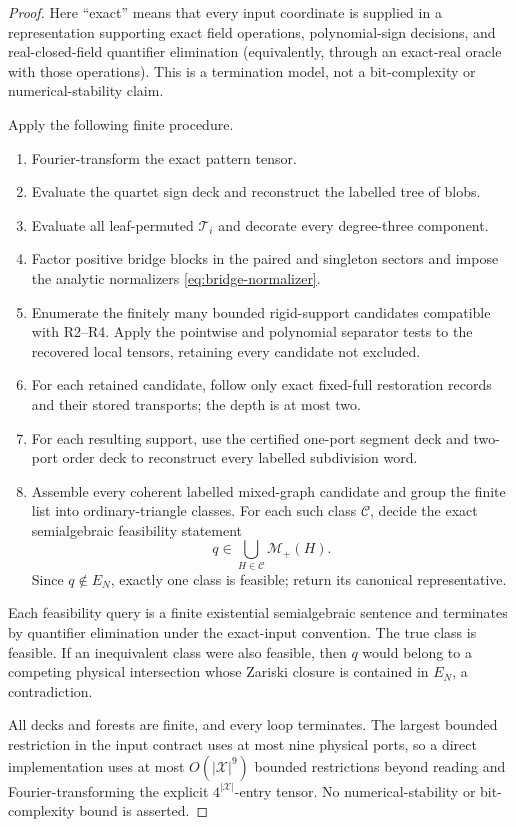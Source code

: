 \documentclass[11pt]{article}
\theoremstyle{remark}
\newcommand{\X}{\mathcal X}
\newcommand{\M}{\mathcal M}
\newcommand{\1}{\mathbf 1}
\begin{document}
\begin{proof}
Here ``exact'' means that every input coordinate is supplied in a
representation supporting exact field operations, polynomial-sign decisions,
and real-closed-field quantifier elimination (equivalently, through an
exact-real oracle with those operations).  This is a termination model, not a
bit-complexity or numerical-stability claim.

Apply the following finite procedure.
\begin{enumerate}[label=\textbf{R\arabic*.}]
  \item Fourier-transform the exact pattern tensor.
  \item Evaluate the quartet sign deck and reconstruct the labelled tree of
        blobs.
  \item Evaluate all leaf-permuted \(\mathcal T_i\) and decorate every
        degree-three component.
  \item Factor positive bridge blocks in the paired and singleton sectors and
        impose the analytic normalizers \eqref{eq:bridge-normalizer}.
  \item Enumerate the finitely many bounded rigid-support candidates
        compatible with R2--R4.  Apply the pointwise and polynomial separator
        tests to the recovered local tensors, retaining every candidate not
        excluded.
  \item For each retained candidate, follow only exact fixed-full restoration
        records and their stored transports; the depth is at most two.
  \item For each resulting support, use the certified one-port segment deck
        and two-port order deck to reconstruct every labelled subdivision
        word.
  \item Assemble every coherent labelled mixed-graph candidate and group the
        finite list into ordinary-triangle classes.  For each such class
        \(\mathcal C\), decide the exact semialgebraic feasibility statement
        \[
          q\in\bigcup_{H\in\mathcal C}\M_+(H).
        \]
        Since \(q\notin E_N\), exactly one class is feasible; return its
        canonical representative.
\end{enumerate}
Each feasibility query is a finite existential semialgebraic sentence and
terminates by quantifier elimination under the exact-input convention.  The
true class is feasible.  If an inequivalent class were also feasible, then
\(q\) would belong to a competing physical intersection whose Zariski closure
is contained in \(E_N\), a contradiction.

All decks and forests are finite, and every loop terminates.  The largest
bounded restriction in the input contract uses at most nine physical ports,
so a direct implementation uses at most \(O(|\X|^9)\) bounded restrictions
beyond reading and Fourier-transforming the explicit \(4^{|\X|}\)-entry
tensor.  No numerical-stability or bit-complexity bound is asserted.
\end{proof}
\end{document}
